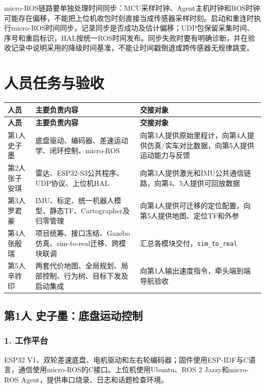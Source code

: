 \documentclass[UTF8,fontset=fandol,11pt,a4paper]{ctexart}
\begin{document}
micro-ROS链路要单独处理时间同步：MCU采样时钟、Agent主机时钟和ROS时钟可能存在偏移，不能把上位机收包时刻直接当成传感器采样时刻。启动和重连时执行micro-ROS时间同步，记录同步是否成功及估计偏移；UDP包保留采集时间、序号和重启标识，HAL按统一ROS时间发布。同步失败时要有明确诊断，并在验收记录中说明采用的降级时间基准，不能让时间戳倒退或跨传感器无规律跳变。

\section{人员任务与验收}
{\small
\begin{longtable}{|>{\raggedright\arraybackslash}p{}|>{\raggedright\arraybackslash}p{}|>{\raggedright\arraybackslash}p{}|}
\hline
\rowcolor{TableHead} \textbf{人员} & \textbf{主要负责内容} & \textbf{交接对象} \\ \hline
\endfirsthead
\hline
\rowcolor{TableHead} \textbf{人员} & \textbf{主要负责内容} & \textbf{交接对象} \\ \hline
\endhead
\endfoot
\endlastfoot
第1人 史子墨 & 底盘驱动、编码器、差速运动学、闭环控制、micro-ROS & 向第3人提供原始里程计，向第4人提供仿真/实车对比数据，向第5人提供运动能力与反馈 \\ \hline
第2人 张子安琪 & 雷达、ESP32-S3公共程序、UDP协议、上位机HAL & 向第3人提供激光和IMU公共通信链路，向第4、5人提供可回放数据 \\ \hline
第3人 罗君豪 & IMU、标定、统一机器人模型、静态TF、Cartographer及归零管理 & 向第4人提供可迁移的定位配置，向第5人提供地图、定位TF和外参 \\ \hline
第4人 张殷瑞 & 项目统筹、接口冻结、Gazebo仿真、sim-to-real迁移、跨模块联调 & 汇总各模块交付，\nolinkurl{sim_to_real} \\ \hline
第5人 辛祚印 & 两套代价地图、全局规划、局部控制、行为树、目标下发及启动集成 & 向第1人输出速度指令，牵头端到端导航验收 \\ \hline
\end{longtable}
}
\subsection{第1人 史子墨：底盘运动控制}
\subsubsection*{1. 工作平台}
ESP32 V1、双轮差速底盘、电机驱动和左右轮编码器；固件使用ESP-IDF与C语言，通信使用micro-ROS的C接口。上位机使用Ubuntu、ROS 2 Jazzy和micro-ROS Agent，提供串口烧录、日志和话题检查环境。
\end{document}
